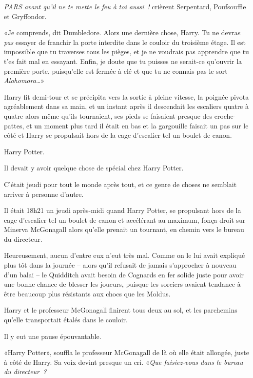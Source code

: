 \emph{PARS avant qu'il ne te mette le feu à toi aussi~!} crièrent Serpentard, Poufsouffle et Gryffondor.

«Je comprends, dit Dumbledore. Alors une dernière chose, Harry. Tu ne devras \emph{pas} essayer de franchir la porte interdite dans le couloir du troisième étage. Il est impossible que tu traverses tous les pièges, et je ne voudrais pas apprendre que tu t'es fait mal en essayant. Enfin, je doute que tu puisses ne serait-ce qu'ouvrir la première porte, puisqu'elle est fermée à clé et que tu ne connais pas le sort \emph{Alohomora}…»

Harry fit demi-tour et se précipita vers la sortie à pleine vitesse, la poignée pivota agréablement dans sa main, et un instant après il descendait les escaliers quatre à quatre alors même qu'ils tournaient, ses pieds se faisaient presque des croche-pattes, et un moment plus tard il était en bas et la gargouille faisait un pas sur le côté et Harry se propulsait hors de la cage d'escalier tel un boulet de canon.

\later

Harry Potter.

Il devait y avoir quelque chose de spécial chez Harry Potter.

C'était jeudi pour tout le monde après tout, et ce genre de choses ne semblait arriver à personne d'autre.

Il était 18h21 un jeudi après-midi quand Harry Potter, se propulsant hors de la cage d'escalier tel un boulet de canon et accélérant au maximum, fonça droit sur Minerva McGonagall alors qu'elle prenait un tournant, en chemin vers le bureau du directeur.

Heureusement, aucun d'entre eux n'eut très mal. Comme on le lui avait expliqué plus tôt dans la journée -- alors qu'il refusait de jamais s'approcher à nouveau d'un balai -- le Quidditch avait besoin de Cognards en fer solide juste pour avoir une bonne chance de blesser les joueurs, puisque les sorciers avaient tendance à être beaucoup plus résistants aux chocs que les Moldus.

Harry et le professeur McGonagall finirent tous deux au sol, et les parchemins qu'elle transportait étalés dans le couloir.

Il y eut une pause épouvantable.

«Harry Potter», souffla le professeur McGonagall de là où elle était allongée, juste à côté de Harry. Sa voix devint presque un cri. «\emph{Que faisiez-vous dans le bureau du directeur~?}

